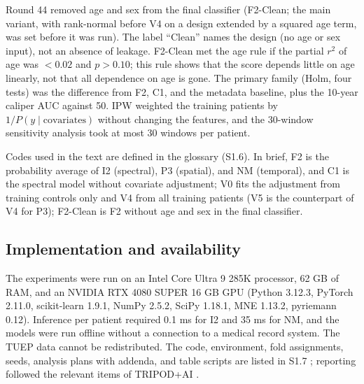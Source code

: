 Round 44 removed age and sex from the final classifier (F2-Clean; the main variant, with rank-normal before V4 on a design extended by a squared age term, was set before it was run). The label ``Clean'' names the design (no age or sex input), not an absence of leakage. F2-Clean met the age rule if the partial $r^2$ of age was $<0.02$ and $p>0.10$; this rule shows that the score depends little on age linearly, not that all dependence on age is gone. The primary family (Holm, four tests) was the difference from F2, C1, and the metadata baseline, plus the 10-year caliper AUC against 50. IPW weighted the training patients by $1/P(y\mid\text{covariates})$ without changing the features, and the 30-window sensitivity analysis took at most 30 windows per patient.\par\endgroup

Codes used in the text are defined in the glossary (S1.6). In brief, F2 is the probability average of I2 (spectral), P3 (spatial), and NM (temporal), and C1 is the spectral model without covariate adjustment; V0 fits the adjustment from training controls only and V4 from all training patients (V5 is the counterpart of V4 for P3); F2-Clean is F2 without age and sex in the final classifier.

\subsection{Implementation and availability}\label{sec:implementasi}

The experiments were run on an Intel Core Ultra 9 285K processor, 62 GB of RAM, and an NVIDIA RTX 4080 SUPER 16 GB GPU (Python 3.12.3, PyTorch 2.11.0, scikit-learn 1.9.1, NumPy 2.5.2, SciPy 1.18.1, MNE 1.13.2, pyriemann 0.12). Inference per patient required 0.1 ms for I2 and 35 ms for NM, and the models were run offline without a connection to a medical record system.
The TUEP data cannot be redistributed. The code, environment, fold assignments, seeds, analysis plans with addenda, and table scripts are listed in S1.7 ; reporting followed the relevant items of TRIPOD+AI \cite{collins2024tripod}.
